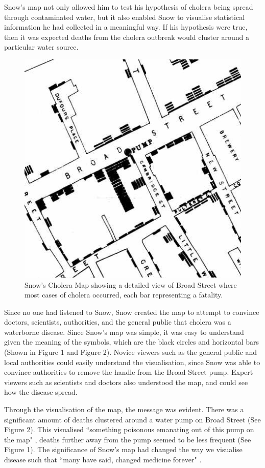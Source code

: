 \documentclass[12pt]{article}
\begin{document}
Snow's map not only allowed him to test his hypothesis of cholera being spread through contaminated water, but it also enabled Snow to visualise statistical information he had collected in a meaningful way. If his hypothesis were true, then it was expected deaths from the cholera outbreak would cluster around a particular water source. 

\begin{figure}
\centering
\includegraphics[scale=0.8]{images/snow_map_detail}
\caption{Snow's Cholera Map showing a detailed view of Broad Street where most cases of cholera occurred, each bar representing a fatality. }
\label{fig:snow}
\end{figure}

Since no one had listened to Snow, Snow created the map to attempt to convince doctors, scientists, authorities, and the general public that cholera was a waterborne disease. Since Snow's map was simple, it was easy to understand given the meaning of the symbols, which are the black circles and horizontal bars (Shown in Figure 1 and Figure 2). Novice viewers such as the general public and local authorities could easily understand the visualisation, since Snow was able to convince authorities to remove the handle from the Broad Street pump. Expert viewers such as scientists and doctors also understood the map, and could see how the disease spread. 

Through the visualisation of the map, the message was evident. There was a significant amount of deaths clustered around a water pump on Broad Street (See Figure 2). This visualised ``something poisonous emanating out of this pump on the map" \cite{blog}, deaths further away from the pump seemed to be less frequent (See Figure 1). The significance of Snow's map had changed the way we visualise disease such that ``many have said, changed medicine forever" \cite{heros}.
\end{document}
